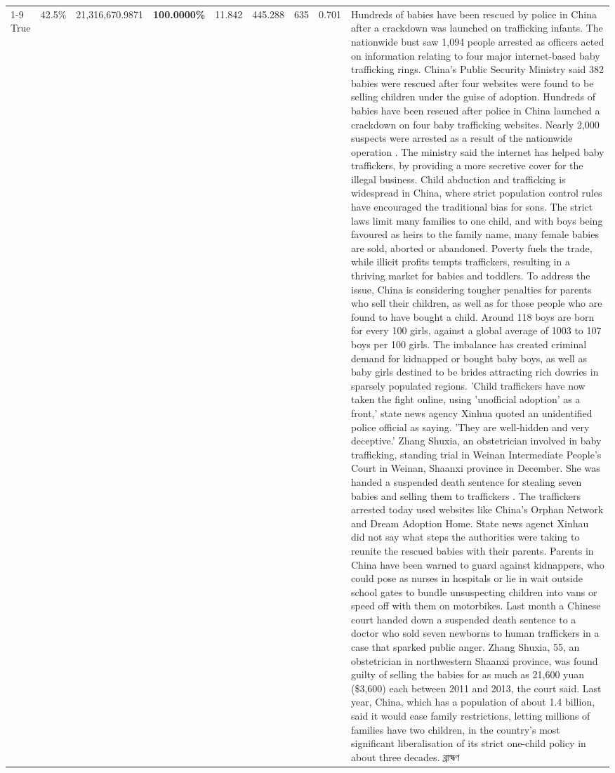 \begin{table}[H]
\begin{tabular}{lllrlllll}
\cline{1-9}
True & 42.5\% & 21,316,670.9871 & \bfseries \color{red} 100.0000\% & 11.842 & 445.288 & 635 & 0.701 & Hundreds of babies have been rescued by police in China after a crackdown was launched on trafficking infants. The nationwide bust saw 1,094 people arrested as officers acted on information relating to four major internet-based baby trafficking rings. China's Public Security Ministry said 382 babies were rescued after four websites were found to be selling children under the guise of adoption. Hundreds of babies have been rescued after police in China launched a crackdown on four baby trafficking websites. Nearly 2,000 suspects were arrested as a result of the nationwide operation . The ministry said the internet has helped baby traffickers, by providing a more secretive cover for the illegal business. Child abduction and trafficking is widespread in China, where strict population control rules have encouraged the traditional bias for sons. The strict laws limit many families to one child, and with boys being favoured as heirs to the family name, many female babies are sold, aborted or abandoned. Poverty fuels the trade, while illicit profits tempts traffickers, resulting in a thriving market for babies and toddlers. To address the issue, China is considering tougher penalties for parents who sell their children, as well as for those people who are found to have bought a child. Around 118 boys are born for every 100 girls, against a global average of 1003 to 107 boys per 100 girls. The imbalance has created criminal demand for kidnapped or bought baby boys, as well as baby girls destined to be brides attracting rich dowries in sparsely populated regions. 'Child traffickers have now taken the fight online, using 'unofficial adoption' as a front,' state news agency Xinhua quoted an unidentified police official as saying. 'They are well-hidden and very deceptive.' Zhang Shuxia, an obstetrician involved in baby trafficking, standing trial in Weinan Intermediate People's Court in Weinan, Shaanxi province in December. She was handed a suspended death sentence for stealing seven babies and selling them to traffickers . The traffickers arrested today used websites like China's Orphan Network and Dream Adoption Home. State news agenct Xinhau did not say what steps the authorities were taking to reunite the rescued babies with their parents. Parents in China have been warned to guard against kidnappers, who could pose as nurses in hospitals or lie in wait outside school gates to bundle unsuspecting children into vans or speed off with them on motorbikes. Last month a Chinese court handed down a suspended death sentence to a doctor who sold seven newborns to human traffickers in a case that sparked public anger. Zhang Shuxia, 55, an obstetrician in northwestern Shaanxi province, was found guilty of selling the babies for as much as 21,600 yuan (\$3,600) each between 2011 and 2013, the court said. Last year, China, which has a population of about 1.4 billion, said it would ease family restrictions, letting millions of families have two children, in the country's most significant liberalisation of its strict one-child policy in about three decades. ব্রাহ্মণ \\

\end{tabular}
\end{table}
